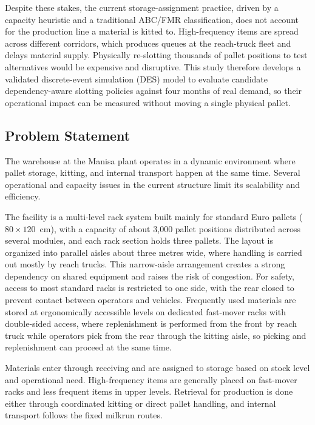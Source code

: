 \documentclass[conference]{IEEEtran}
\begin{document}
Despite these stakes, the current storage-assignment practice, driven by a
capacity heuristic and a traditional ABC/FMR classification, does not account
for the production line a material is kitted to. High-frequency items are
spread across different corridors, which produces queues at the reach-truck
fleet and delays material supply. Physically re-slotting thousands of pallet
positions to test alternatives would be expensive and disruptive. This study
therefore develops a validated discrete-event simulation (DES) model to
evaluate candidate dependency-aware slotting policies against four months of
real demand, so their operational impact can be measured without moving a
single physical pallet.

\subsection{Problem Statement}
The warehouse at the Manisa plant operates in a dynamic environment where
pallet storage, kitting, and internal transport happen at the same time.
Several operational and capacity issues in the current structure limit its
scalability and efficiency.

The facility is a multi-level rack system built mainly for standard Euro
pallets ($80 \times 120$~cm), with a capacity of about 3{,}000 pallet
positions distributed across several modules, and each rack section holds
three pallets. The layout is organized into parallel aisles about three
metres wide, where handling is carried out mostly by reach trucks. This
narrow-aisle arrangement creates a strong dependency on shared equipment and
raises the risk of congestion. For safety, access to most standard racks is
restricted to one side, with the rear closed to prevent contact between
operators and vehicles. Frequently used materials are stored at ergonomically
accessible levels on dedicated fast-mover racks with double-sided access,
where replenishment is performed from the front by reach truck while
operators pick from the rear through the kitting aisle, so picking and
replenishment can proceed at the same time.

Materials enter through receiving and are assigned to storage based on stock
level and operational need. High-frequency items are generally placed on
fast-mover racks and less frequent items in upper levels. Retrieval for
production is done either through coordinated kitting or direct pallet
handling, and internal transport follows the fixed milkrun routes.
\end{document}
